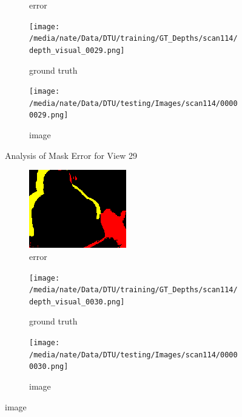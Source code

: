 \documentclass{article}
\begin{document}
\begin{figure}
\begin{subfigure}{0.3\textwidth}
		\caption{error}
		\label{fig:error29}
	\end{subfigure}
	\hfill
	\centering
	\begin{subfigure}{0.3\textwidth}
		\centering
		\texttt{[image: /media/nate/Data/DTU/training/GT\_Depths/scan114/depth\_visual\_0029.png]}
		\caption{ground truth}
		\label{fig:gt29}
	\end{subfigure}
	\hfill
	\centering
	\begin{subfigure}{0.3\textwidth}
		\centering
		\texttt{[image: /media/nate/Data/DTU/testing/Images/scan114/00000029.png]}
		\caption{image}
		\label{fig:img29}
	\end{subfigure}
	\hfill
	\caption{Analysis of Mask Error for View 29}
	\label{fig:error_analys29}
\end{figure}\begin{figure}
	\centering
	\begin{subfigure}{0.3\textwidth}
		\centering
		\includegraphics[width=\textwidth]{./output/030_error.png}
		\caption{error}
		\label{fig:error30}
	\end{subfigure}
	\hfill
	\centering
	\begin{subfigure}{0.3\textwidth}
		\centering
		\texttt{[image: /media/nate/Data/DTU/training/GT\_Depths/scan114/depth\_visual\_0030.png]}
		\caption{ground truth}
		\label{fig:gt30}
	\end{subfigure}
	\hfill
	\centering
	\begin{subfigure}{0.3\textwidth}
		\centering
		\texttt{[image: /media/nate/Data/DTU/testing/Images/scan114/00000030.png]}
		\caption{image}

\end{subfigure}
\end{figure}
\end{document}
